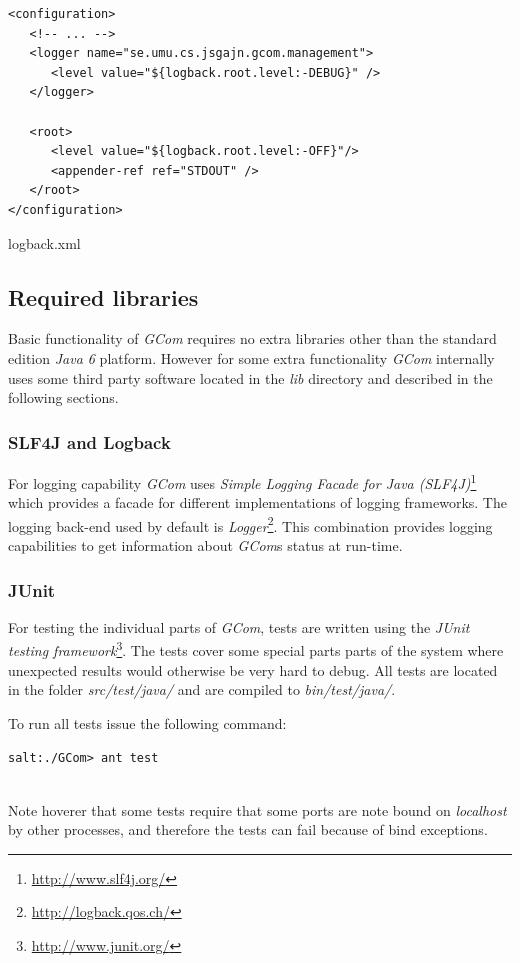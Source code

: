 \documentclass[titlepage, twocolumn, a4paper, 10pt]{article}
\begin{document}
\begin{code}
  \begin{footnotesize}
\begin{verbatim}
<configuration>
   <!-- ... -->
   <logger name="se.umu.cs.jsgajn.gcom.management">
      <level value="${logback.root.level:-DEBUG}" />
   </logger>
   
   <root>
      <level value="${logback.root.level:-OFF}"/>
      <appender-ref ref="STDOUT" />
   </root>
</configuration>
\end{verbatim}
  \end{footnotesize}
  \caption{logback.xml}\label{code:logback}
\end{code}

\subsection{Required libraries}\label{sec:required-libraries}
Basic functionality of \textit{GCom} requires no extra libraries other
than the standard edition \textit{Java 6} platform. However for some
extra functionality \textit{GCom} internally uses some third party
software located in the \textit{lib} directory and described in the
following sections.

\subsubsection{SLF4J and Logback}\label{sec:logback}
For logging capability \textit{GCom} uses \textit{Simple Logging
  Facade for Java (SLF4J)}\footnote{\url{http://www.slf4j.org/}} which
provides a facade for different implementations of logging frameworks.
The logging back-end used by default is
\textit{Logger}\footnote{\url{http://logback.qos.ch/}}. This
combination provides logging capabilities to get information about
\textit{GCom}s status at run-time.

\subsubsection{JUnit}\label{sec:junit}
For testing the individual parts of \textit{GCom}, tests are written
using the \textit{JUnit testing
  framework}\footnote{\url{http://www.junit.org/}}. The tests cover
some special parts parts of the system where unexpected results would
otherwise be very hard to debug. All tests are located in the folder
\textit{src/test/java/} and are compiled to \textit{bin/test/java/}.

To run all tests issue the following command:\\
\begin{footnotesize}
  \verb!salt:./GCom> ant test!
\end{footnotesize}\\
Note hoverer that some tests require that some ports are note bound on
\textit{localhost} by other processes, and therefore the tests can
fail because of bind exceptions.
\end{document}
